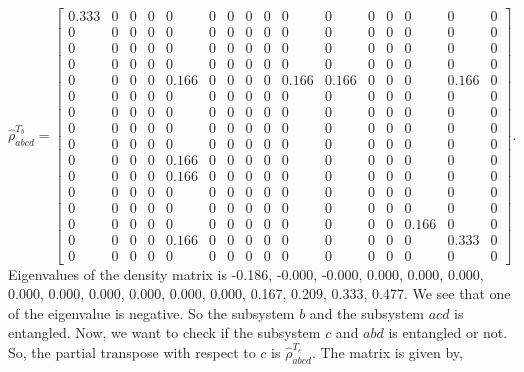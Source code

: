 \documentclass{scrartcl}
\begin{document}
\begin{equation*}
	\hat{\rho}^{T_b}_{abcd} = \left[\begin{array}{cccccccccccccccc}0.333 & 0 & 0 & 0 & 0 & 0 & 0 & 0 & 0 & 0 & 0 & 0 & 0 & 0 & 0 & 0\\0 & 0 & 0 & 0 & 0 & 0 & 0 & 0 & 0 & 0 & 0 & 0 & 0 & 0 & 0 & 0\\0 & 0 & 0 & 0 & 0 & 0 & 0 & 0 & 0 & 0 & 0 & 0 & 0 & 0 & 0 & 0\\0 & 0 & 0 & 0 & 0 & 0 & 0 & 0 & 0 & 0 & 0 & 0 & 0 & 0 & 0 & 0\\0 & 0 & 0 & 0 & 0.166 & 0 & 0 & 0 & 0 & 0.166 & 0.166 & 0 & 0 & 0 & 0.166 & 0\\0 & 0 & 0 & 0 & 0 & 0 & 0 & 0 & 0 & 0 & 0 & 0 & 0 & 0 & 0 & 0\\0 & 0 & 0 & 0 & 0 & 0 & 0 & 0 & 0 & 0 & 0 & 0 & 0 & 0 & 0 & 0\\0 & 0 & 0 & 0 & 0 & 0 & 0 & 0 & 0 & 0 & 0 & 0 & 0 & 0 & 0 & 0\\0 & 0 & 0 & 0 & 0 & 0 & 0 & 0 & 0 & 0 & 0 & 0 & 0 & 0 & 0 & 0\\0 & 0 & 0 & 0 & 0.166 & 0 & 0 & 0 & 0 & 0 & 0 & 0 & 0 & 0 & 0 & 0\\0 & 0 & 0 & 0 & 0.166 & 0 & 0 & 0 & 0 & 0 & 0 & 0 & 0 & 0 & 0 & 0\\0 & 0 & 0 & 0 & 0 & 0 & 0 & 0 & 0 & 0 & 0 & 0 & 0 & 0 & 0 & 0\\0 & 0 & 0 & 0 & 0 & 0 & 0 & 0 & 0 & 0 & 0 & 0 & 0 & 0 & 0 & 0\\0 & 0 & 0 & 0 & 0 & 0 & 0 & 0 & 0 & 0 & 0 & 0 & 0 & 0.166 & 0 & 0\\0 & 0 & 0 & 0 & 0.166 & 0 & 0 & 0 & 0 & 0 & 0 & 0 & 0 & 0 & 0.333 & 0\\0 & 0 & 0 & 0 & 0 & 0 & 0 & 0 & 0 & 0 & 0 & 0 & 0 & 0 & 0 & 0\end{array}\right]
	.
\end{equation*}
Eigenvalues of the density matrix is -0.186, -0.000, -0.000, 0.000, 0.000, 0.000, 0.000, 0.000, 0.000, 0.000, 0.000, 0.000, 0.167, 0.209, 0.333, 0.477. We see that one of the eigenvalue is negative. So the subsystem $b$ and the subsystem $acd$ is entangled. Now, we want to check if the subsystem $c$ and $abd$ is entangled or not. So, the partial transpose with respect to $c$ is $\hat{\rho}^{T_c}_{abcd}$. The matrix is given by, 
\end{document}
